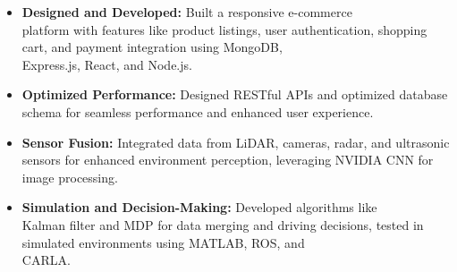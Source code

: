\documentclass[10pt,a4paper,ragged2e,withhyper]{altacv}
\begin{document}
\begin{paracol}{2}

\begin{itemize}
\item \textbf{Designed and Developed:}  Built a responsive e-commerce\\ platform with features like product listings, user authentication, shopping cart, and payment integration using MongoDB, \\Express.js, React, and Node.js.
\item \textbf{Optimized Performance:} Designed RESTful APIs and optimized database schema for seamless performance and enhanced user experience.
\end{itemize}

\medskip

\begin{itemize}
\item \textbf{Sensor Fusion:} Integrated data from LiDAR, cameras, radar, and ultrasonic sensors for enhanced environment perception, leveraging NVIDIA CNN for image processing.

\item \textbf{Simulation and Decision-Making:} Developed algorithms like\\ Kalman filter and MDP for data merging and driving decisions, tested in simulated environments using MATLAB, ROS, and \\CARLA.
\end{itemize}

\medskip


%

\newpage




\end{paracol}
\end{document}
